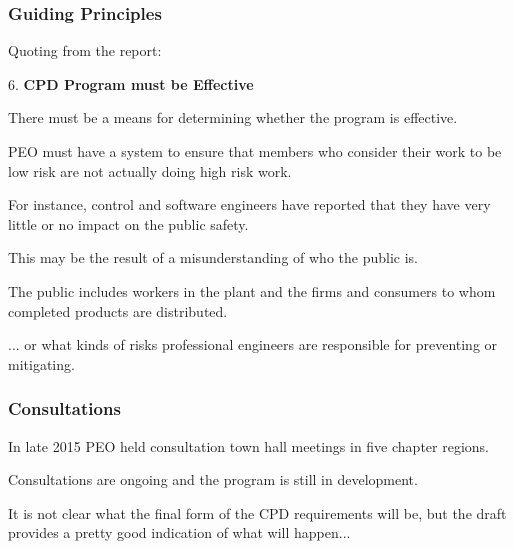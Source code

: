 \begin{frame}
\frametitle{Guiding Principles}

Quoting from the report: 

6. \textbf{CPD Program must be Effective}

There must be a means for determining whether the program is effective.

PEO must have a system to ensure that members who consider their work to be low risk are not actually doing high risk work. 

For instance, control and software engineers have reported that they have very little or no impact on the public safety. 

This may be the result of a misunderstanding of who the public is. 

The public includes workers in the plant and the firms and consumers to whom completed products are distributed.

... or what kinds of risks professional engineers are responsible for preventing or
mitigating.

\end{frame}



\begin{frame}
\frametitle{Consultations}

In late 2015 PEO held consultation town hall meetings in five chapter regions.

Consultations are ongoing and the program is still in development.

It is not clear what the final form of the CPD requirements will be, but the draft provides a pretty good indication of what will happen...


\end{frame}




